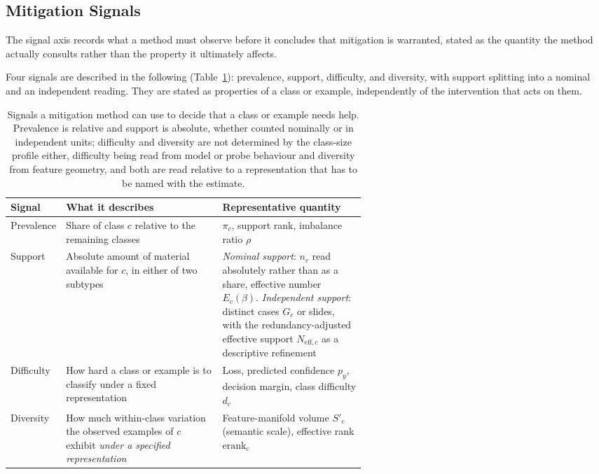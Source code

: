 \documentclass[11pt]{article}
\begin{document}
\subsection{Mitigation Signals}
\label{sec:signal-axis}
The signal axis records what a method must observe before it concludes that mitigation is warranted, stated as the quantity the method actually consults rather than the property it ultimately affects.

Four signals are described in the following (Table~\ref{tab:signals}): prevalence, support, difficulty, and diversity, with support splitting into a nominal and an independent reading. They are stated as properties of a class or example, independently of the intervention that acts on them.

\begin{table}[ht]
  \centering
  \footnotesize
  \begin{tabularx}{\linewidth}{@{}>{\raggedright\arraybackslash}p{0.15\linewidth}>{\raggedright\arraybackslash}p{0.44\linewidth}>{\raggedright\arraybackslash}X@{}}
    \toprule
    Signal & What it describes & Representative quantity \\
    \midrule
    Prevalence & Share of class $c$ relative to the remaining classes & $\pi_c$, support rank, imbalance ratio $\rho$ \\
    Support & Absolute amount of material available for $c$, in either of two subtypes & \emph{Nominal support}: $n_c$ read absolutely rather than as a share, effective number $E_c(\beta)$. \emph{Independent support}: distinct cases $G_c$ or slides, with the redundancy-adjusted effective support $N_{\mathrm{eff},c}$ as a descriptive refinement \\
    Difficulty & How hard a class or example is to classify under a fixed representation & Loss, predicted confidence $p_y$, decision margin, class difficulty $d_c$ \\
    Diversity & How much within-class variation the observed examples of $c$ exhibit \emph{under a specified representation} & Feature-manifold volume $S'_c$ (semantic scale), effective rank $\mathrm{erank}_c$ \\
    \bottomrule
  \end{tabularx}
  \caption{Signals a mitigation method can use to decide that a class or example needs help. Prevalence is relative and support is absolute, whether counted nominally or in independent units; difficulty and diversity are not determined by the class-size profile either, difficulty being read from model or probe behaviour and diversity from feature geometry, and both are read relative to a representation that has to be named with the estimate.}
  \label{tab:signals}
\end{table}
\end{document}
